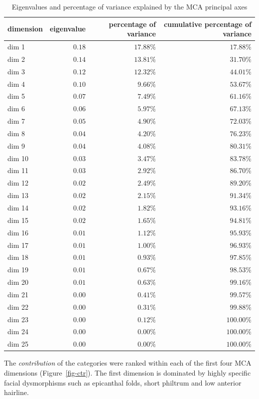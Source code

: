 \documentclass[
  authoryear,
  preprint,
  3p]{elsarticle}
\begin{document}
\hypertarget{tbl-eig}{}
\begin{longtable}{lrrr}
\caption{\label{tbl-eig}Eigenvalues and percentage of variance explained by the MCA principal
axes }\tabularnewline

\toprule
dimension & eigenvalue & percentage of variance & cumulative percentage of variance \\ 
\midrule
dim 1 & $0.18$ & $17.88\%$ & $17.88\%$ \\ 
dim 2 & $0.14$ & $13.81\%$ & $31.70\%$ \\ 
dim 3 & $0.12$ & $12.32\%$ & $44.01\%$ \\ 
dim 4 & $0.10$ & $9.66\%$ & $53.67\%$ \\ 
dim 5 & $0.07$ & $7.49\%$ & $61.16\%$ \\ 
dim 6 & $0.06$ & $5.97\%$ & $67.13\%$ \\ 
dim 7 & $0.05$ & $4.90\%$ & $72.03\%$ \\ 
dim 8 & $0.04$ & $4.20\%$ & $76.23\%$ \\ 
dim 9 & $0.04$ & $4.08\%$ & $80.31\%$ \\ 
dim 10 & $0.03$ & $3.47\%$ & $83.78\%$ \\ 
dim 11 & $0.03$ & $2.92\%$ & $86.70\%$ \\ 
dim 12 & $0.02$ & $2.49\%$ & $89.20\%$ \\ 
dim 13 & $0.02$ & $2.15\%$ & $91.34\%$ \\ 
dim 14 & $0.02$ & $1.82\%$ & $93.16\%$ \\ 
dim 15 & $0.02$ & $1.65\%$ & $94.81\%$ \\ 
dim 16 & $0.01$ & $1.12\%$ & $95.93\%$ \\ 
dim 17 & $0.01$ & $1.00\%$ & $96.93\%$ \\ 
dim 18 & $0.01$ & $0.93\%$ & $97.85\%$ \\ 
dim 19 & $0.01$ & $0.67\%$ & $98.53\%$ \\ 
dim 20 & $0.01$ & $0.63\%$ & $99.16\%$ \\ 
dim 21 & $0.00$ & $0.41\%$ & $99.57\%$ \\ 
dim 22 & $0.00$ & $0.31\%$ & $99.88\%$ \\ 
dim 23 & $0.00$ & $0.12\%$ & $100.00\%$ \\ 
dim 24 & $0.00$ & $0.00\%$ & $100.00\%$ \\ 
dim 25 & $0.00$ & $0.00\%$ & $100.00\%$ \\ 
\bottomrule
\end{longtable}

The \emph{contribution} of the categories were ranked within each of the
first four MCA dimensions (Figure~\ref{fig-ctr}). The first dimension is
dominated by highly specific facial dysmorphisms such as epicanthal
folds, short philtrum and low anterior hairline.
\end{document}
